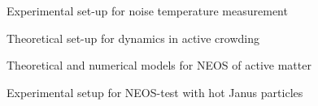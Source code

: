 \begin{workpackage}
\begin{wpdelivs}
\begin{wpdeliv}[due=12,id=D2.3,dissem=PU,nature=DEM,lead=Leipzig]
      {Experimental set-up for noise temperature measurement}
  \end{wpdeliv}
  \begin{wpdeliv}[due=24,id=D2.1,dissem=PU,nature=DEM,lead=Leipzig]
      {Theoretical set-up for dynamics in active crowding}
  \end{wpdeliv}
  \begin{wpdeliv}[due=24,id=D2.2,dissem=PU,nature=DEM,lead=Leipzig]
      {Theoretical and numerical models for NEOS of active matter}
\end{wpdeliv}
  \begin{wpdeliv}[due=36,id=D2.4,dissem=PU,nature=DEM,lead=Leipzig]
      {Experimental setup for NEOS-test with hot Janus particles}
\end{wpdeliv}
\end{wpdelivs}

\end{workpackage}
